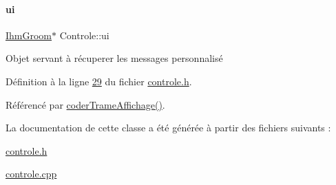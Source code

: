 \paragraph{\texorpdfstring{ui}{ui}}
{\footnotesize\ttfamily \hyperlink{class_ihm_groom}{Ihm\+Groom}$\ast$ Controle\+::ui\hspace{0.3cm}{\ttfamily [private]}}

Objet servant à récuperer les messages personnalisé 

Définition à la ligne \hyperlink{controle_8h_source_l00029}{29} du fichier \hyperlink{controle_8h_source}{controle.\+h}.



Référencé par \hyperlink{controle_8cpp_source_l00101}{coder\+Trame\+Affichage()}.



La documentation de cette classe a été générée à partir des fichiers suivants \+:\begin{DoxyCompactItemize}
\item 
\hyperlink{controle_8h}{controle.\+h}\item 
\hyperlink{controle_8cpp}{controle.\+cpp}\end{DoxyCompactItemize}
